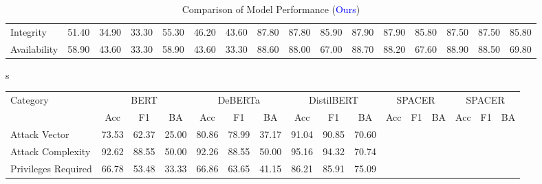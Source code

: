 \documentclass{article}
\begin{document}
\begin{table}[h!]
\begin{tabular}{|l|ccc|ccc|ccc|ccc|ccc|}
		Integrity                 & 51.40                     & 34.90                        & 33.30                           & 55.30                     & 46.20                         & 43.60 & 87.80 & 87.80 & 85.90 & 87.90 & 87.90 & 85.80 & 87.50 & 87.50 & 85.80 \\
		Availability              & 58.90                     & 43.60                        & 33.30                           & 58.90                     & 43.60                         & 33.30 & 88.60 & 88.00 & 67.00 & 88.70 & 88.20 & 67.60 & 88.90 & 88.50 & 69.80 \\
		\hline
	\end{tabular}
	\caption{Comparison of Model Performance (\textcolor{blue}{Ours})}
	\label{tab:model_performance}
\end{table}s

\begin{table}[h!]
	\centering
	\small
	\begin{tabular}{|l|ccc|ccc|ccc|ccc|ccc|}
		\hline
		\multirow{2}{*}{Category} & \multicolumn{3}{c|}{BERT} & \multicolumn{3}{c|}{DeBERTa} & \multicolumn{3}{c|}{DistilBERT} & \multicolumn{3}{c|}{SPACER} & \multicolumn{3}{c|}{SPACER}                                                                                                                                             \\
		\cline{2-16}
		                          & Acc                       & F1                           & BA                              & Acc                         & F1                          & BA    & Acc   & F1    & BA    & Acc             & F1              & BA              & Acc             & F1              & BA              \\
		\hline
		Attack Vector             & 73.53                     & 62.37                        & 25.00                           & 80.86                       & 78.99                       & 37.17 & 91.04 & 90.85 & 70.60 & \phantom{11.11} & \phantom{11.11} & \phantom{11.11} & \phantom{11.11} & \phantom{11.11} & \phantom{11.11} \\
		Attack Complexity         & 92.62                     & 88.55                        & 50.00                           & 92.26                       & 88.55                       & 50.00 & 95.16 & 94.32 & 70.74 & \phantom{5}     & \phantom{5}     & \phantom{5}     & \phantom{5}     & \phantom{5}     & \phantom{5}     \\
		Privileges Required       & 66.78                     & 53.48                        & 33.33                           & 66.86                       & 63.65                       & 41.15 & 86.21 & 85.91 & 75.09 & \phantom{5}     & \phantom{5}     & \phantom{5}     & \phantom{5}     & \phantom{5}     & \phantom{5}     \\

\end{tabular}
\end{table}
\end{document}
